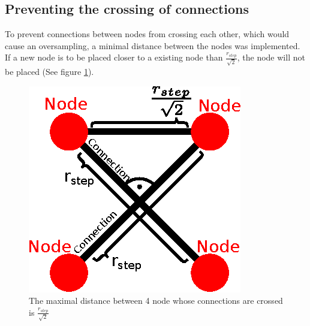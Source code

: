 \documentclass[12pt,english,twocolumn]{revtex4}
\begin{document}
\subsection{Preventing the crossing of connections}
To prevent connections between nodes from crossing each other, which would cause an oversampling, a minimal distance between the nodes was implemented. If a new node is to be placed closer to a existing node than $\frac{r_{step}}{\sqrt{2}}$, the node will not be placed (See figure \ref{fig:min_dist}).
\begin{figure}[h!]
	\includegraphics[width=\linewidth]{figures/min_dist.eps}
	\caption{The maximal distance between 4 node whose connections are crossed is $\frac{r_{step}}{\sqrt{2}}$}
	\label{fig:min_dist}
\end{figure}
\end{document}

